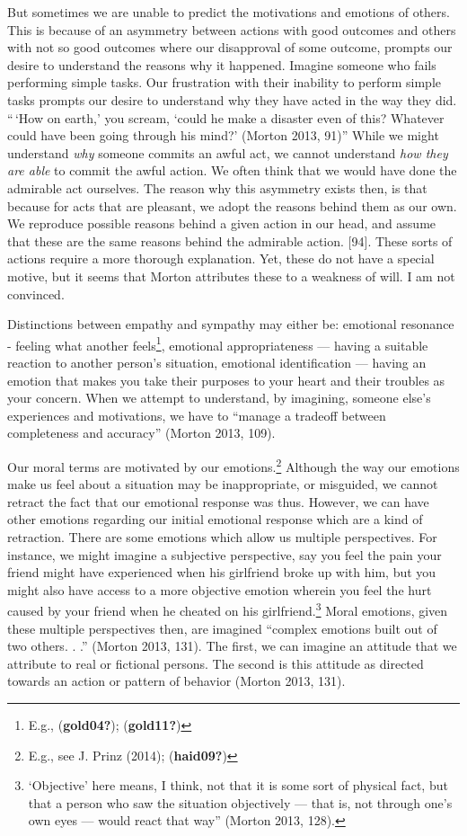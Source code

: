 \documentclass[12pt]{book}
\theoremstyle{definition}
\theoremstyle{remark}
\begin{document}
But sometimes we are unable to predict the motivations and emotions of others. This is because of an asymmetry between actions with good outcomes and others
with not so good outcomes where our disapproval of some outcome, prompts our desire to understand the reasons why it happened. Imagine someone who fails performing simple tasks. Our frustration with their inability to perform simple tasks prompts our desire to understand why they have acted in the way they did. ``\,`How on earth,' you scream, `could he make a disaster even of this? Whatever could have been going through his mind?' (Morton 2013, 91)'' While we might understand \emph{why} someone commits an awful act, we cannot understand \emph{how they are able} to commit the awful action. We often think that we would have done the admirable act ourselves. The reason why this asymmetry exists then, is that because for acts that are pleasant, we adopt the reasons behind them as our own. We reproduce possible reasons behind a given action in our head, and assume that these are the same reasons behind the admirable action.
{[}94{]}. These sorts of actions require a more thorough explanation. Yet, these do not have a special motive, but it seems that Morton attributes these to a weakness of will. I am not convinced.

Distinctions between empathy and sympathy may either be: emotional resonance - feeling what another feels\footnote{E.g., (\textbf{gold04?}); (\textbf{gold11?})}, emotional appropriateness --- having a suitable reaction to another person's situation, emotional identification --- having an emotion that makes you take their purposes to your heart
and their troubles as your concern. When we attempt to understand, by imagining, someone else's experiences and motivations, we have to
``manage a tradeoff between completeness and accuracy'' (Morton 2013, 109).

Our moral terms are motivated by our emotions.\footnote{E.g., see J. Prinz (2014); (\textbf{haid09?})} Although the way our emotions make us feel about a situation may be inappropriate, or misguided, we cannot retract the fact that our emotional response was thus. However, we can have other emotions regarding our initial emotional response which are a kind of retraction. There are some emotions which allow us multiple perspectives. For instance, we might imagine a subjective perspective, say you feel the pain your friend might have experienced when his girlfriend broke up with him, but you might also have access to a more objective emotion wherein you feel the hurt caused by your friend when he cheated on his girlfriend.\footnote{`Objective' here means, I think, not that it is some sort of physical fact, but that a person who saw the situation objectively --- that is, not through one's own eyes --- would react that way'' (Morton 2013, 128).} Moral emotions, given these multiple perspectives then, are imagined ``complex emotions built out of two others. . .'' (Morton 2013, 131). The first, we can imagine an attitude that we attribute to real or fictional persons. The second is this attitude as directed towards an action or pattern of behavior (Morton 2013, 131).
\end{document}
